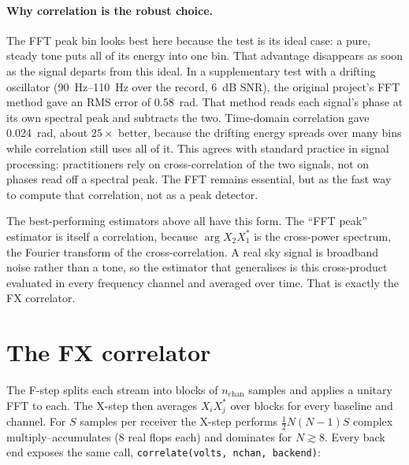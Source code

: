 \documentclass[11pt,a4paper]{article}
\begin{document}
\paragraph{Why correlation is the robust choice.}
The FFT peak bin looks best here because the test is its ideal case: a pure, steady tone puts all of
its energy into one bin. That advantage disappears as soon as the signal departs from this ideal. In
a supplementary test with a drifting oscillator (\SIrange{90}{110}{Hz} over the record, \SI{6}{dB}
SNR), the original project's FFT method gave an RMS error of \SI{0.58}{rad}. That method reads each
signal's phase at its own spectral peak and subtracts the two. Time-domain correlation gave
\SI{0.024}{rad}, about $25\times$ better, because the drifting energy spreads over many bins while
correlation still uses all of it. This agrees with standard practice in signal processing:
practitioners rely on cross-correlation of the two signals, not on phases read off a spectral peak.
The FFT remains essential, but as the fast way to compute that correlation, not as a peak detector.

The best-performing estimators above all have this form. The ``FFT peak'' estimator is itself a
correlation, because $\arg X_2X_1^*$ is the cross-power spectrum, the Fourier transform of the
cross-correlation. A real sky signal is broadband noise rather than a tone, so the estimator that
generalises is this cross-product evaluated in every frequency channel and averaged over time. That
is exactly the FX correlator.

\section{The FX correlator}\label{sec:corr}

The F-step splits each stream into blocks of $n_{\mathrm{chan}}$ samples and applies a unitary FFT to
each. The X-step then averages $X_iX_j^*$ over blocks for every baseline and channel. For $S$
samples per receiver the X-step performs $\tfrac12N(N-1)S$ complex multiply--accumulates (8 real
flops each) and dominates for $N\gtrsim8$. Every back end exposes the same call,
\texttt{correlate(volts, nchan, backend)}:
\end{document}
